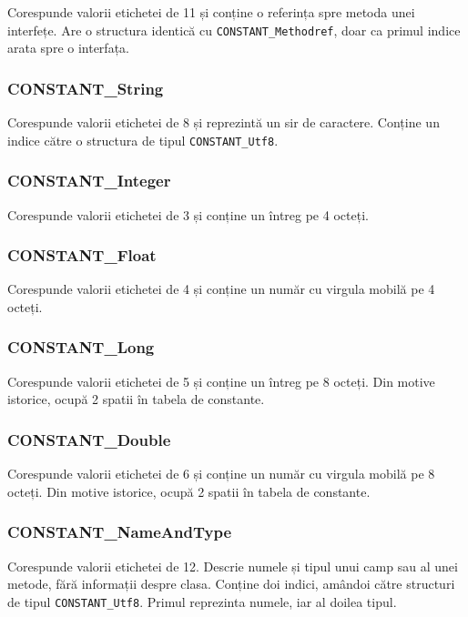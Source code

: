 Corespunde valorii etichetei de 11 și conține o referința spre metoda
unei interfețe. Are o structura identică cu
\texttt{CONSTANT\_Methodref}, doar ca primul indice arata spre o
interfața.

\subsubsection{CONSTANT\_String}

Corespunde valorii etichetei de 8 și reprezintă un sir de caractere.
Conține un indice către o structura de tipul \texttt{CONSTANT\_Utf8}.

\subsubsection{CONSTANT\_Integer}

Corespunde valorii etichetei de 3 și conține un întreg pe 4 octeți.

\subsubsection{CONSTANT\_Float}

Corespunde valorii etichetei de 4 și conține un număr cu virgula mobilă
pe 4 octeți.

\subsubsection{CONSTANT\_Long}

Corespunde valorii etichetei de 5 și conține un întreg pe 8 octeți. Din
motive istorice, ocupă 2 spatii în tabela de constante.

\subsubsection{CONSTANT\_Double}

Corespunde valorii etichetei de 6 și conține un număr cu virgula mobilă
pe 8 octeți. Din motive istorice, ocupă 2 spatii în tabela de constante.

\subsubsection{CONSTANT\_NameAndType}

Corespunde valorii etichetei de 12. Descrie numele și tipul unui camp
sau al unei metode, fără informații despre clasa. Conține doi indici,
amândoi către structuri de tipul \texttt{CONSTANT\_Utf8}. Primul
reprezinta numele, iar al doilea tipul.

